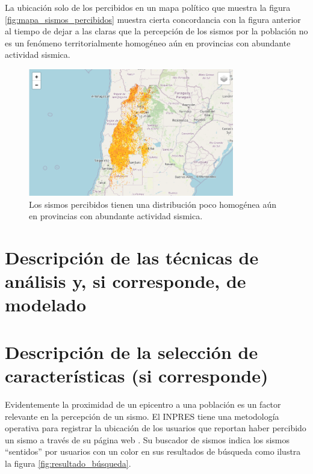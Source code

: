 \documentclass[a4paper]{report}
\begin{document}
La ubicación solo de los percibidos en un mapa político que muestra la figura \ref{fig:mapa_sismos_percibidos} muestra cierta concordancia con la figura anterior al tiempo de dejar a las claras que la percepción de los sismos por la población no es un fenómeno territorialmente homogéneo aún en provincias con abundante actividad sismica.
\begin{figure}[h]
\centering
\includegraphics[width=0.8\textwidth]{mapa_percibidos.png}
\caption{Los sismos percibidos tienen una distribución poco homogénea aún en provincias con abundante actividad sismica.}
\label{fig:mapa_percibidos}
\end{figure}




\section{Descripción de las técnicas de análisis y, si corresponde, de modelado}



\section{Descripción de la selección de características (si corresponde)}

Evidentemente la proximidad de un epicentro a una población es un factor relevante en la percepción de un sismo.
El INPRES tiene una metodología operativa para registrar la ubicación de los usuarios que reportan haber percibido un sismo a través de su página web \cite{noauthor_acerca_nodate}.
Su buscador de sismos indica los sismos ``sentidos'' por usuarios con un color en sus resultados de búsqueda como ilustra la figura \ref{fig:resultado_búsqueda}.
\end{document}
